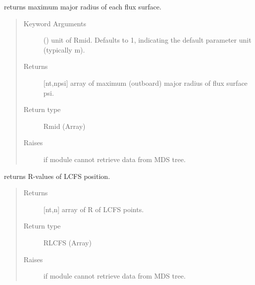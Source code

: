 \documentclass[letterpaper,10pt,english]{sphinxmanual}
\begin{document}
\begin{fulllineitems}
\begin{fulllineitems}
\label{\detokenize{eqtools:eqtools.TCVLIUQE.TCVLIUQETree.getRmidPsi}}
returns maximum major radius of each flux surface.
\begin{quote}\begin{description}
\item[{Keyword Arguments}] \leavevmode
{} () \textendash{} unit of Rmid.  Defaults to 1, indicating
the default parameter unit (typically m).

\item[{Returns}] \leavevmode
{[}nt,npsi{]} array of maximum (outboard) major radius of
flux surface psi.

\item[{Return type}] \leavevmode
Rmid (Array)

\item[{Raises}] \leavevmode
{} \textendash{} if module cannot retrieve data from MDS tree.

\end{description}\end{quote}

\end{fulllineitems}


\begin{fulllineitems}
\label{\detokenize{eqtools:eqtools.TCVLIUQE.TCVLIUQETree.getRLCFS}}
returns R-values of LCFS position.
\begin{quote}\begin{description}
\item[{Returns}] \leavevmode
{[}nt,n{]} array of R of LCFS points.

\item[{Return type}] \leavevmode
RLCFS (Array)

\item[{Raises}] \leavevmode
{} \textendash{} if module cannot retrieve data from MDS tree.


\end{description}
\end{quote}
\end{fulllineitems}
\end{fulllineitems}
\end{document}
